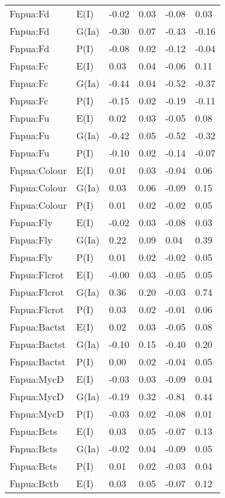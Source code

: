 \begin{center}
\begin{longtable}{|p{1.1in}|p{0.7in}|p{0.7in}|p{0.6in}|p{0.6in}|p{0.6in}|}
  Fnpua:Fd & E(I) & -0.02 & 0.03 & -0.08 & 0.03 \\ 
  Fnpua:Fd & G(Ia) & -0.30 & 0.07 & -0.43 & -0.16 \\ 
  Fnpua:Fd & P(I) & -0.08 & 0.02 & -0.12 & -0.04 \\ 
  Fnpua:Fc & E(I) & 0.03 & 0.04 & -0.06 & 0.11 \\ 
  Fnpua:Fc & G(Ia) & -0.44 & 0.04 & -0.52 & -0.37 \\ 
  Fnpua:Fc & P(I) & -0.15 & 0.02 & -0.19 & -0.11 \\ 
  Fnpua:Fu & E(I) & 0.02 & 0.03 & -0.05 & 0.08 \\ 
  Fnpua:Fu & G(Ia) & -0.42 & 0.05 & -0.52 & -0.32 \\ 
  Fnpua:Fu & P(I) & -0.10 & 0.02 & -0.14 & -0.07 \\ 
  Fnpua:Colour & E(I) & 0.01 & 0.03 & -0.04 & 0.06 \\ 
  Fnpua:Colour & G(Ia) & 0.03 & 0.06 & -0.09 & 0.15 \\ 
  Fnpua:Colour & P(I) & 0.01 & 0.02 & -0.02 & 0.05 \\ 
  Fnpua:Fly & E(I) & -0.02 & 0.03 & -0.08 & 0.03 \\ 
  Fnpua:Fly & G(Ia) & 0.22 & 0.09 & 0.04 & 0.39 \\ 
  Fnpua:Fly & P(I) & 0.01 & 0.02 & -0.02 & 0.05 \\ 
  Fnpua:Flcrot & E(I) & -0.00 & 0.03 & -0.05 & 0.05 \\ 
  Fnpua:Flcrot & G(Ia) & 0.36 & 0.20 & -0.03 & 0.74 \\ 
  Fnpua:Flcrot & P(I) & 0.03 & 0.02 & -0.01 & 0.06 \\ 
  Fnpua:Bactst & E(I) & 0.02 & 0.03 & -0.05 & 0.08 \\ 
  Fnpua:Bactst & G(Ia) & -0.10 & 0.15 & -0.40 & 0.20 \\ 
  Fnpua:Bactst & P(I) & 0.00 & 0.02 & -0.04 & 0.05 \\ 
  Fnpua:MycD & E(I) & -0.03 & 0.03 & -0.09 & 0.04 \\ 
  Fnpua:MycD & G(Ia) & -0.19 & 0.32 & -0.81 & 0.44 \\ 
  Fnpua:MycD & P(I) & -0.03 & 0.02 & -0.08 & 0.01 \\ 
  Fnpua:Bcts & E(I) & 0.03 & 0.05 & -0.07 & 0.13 \\ 
  Fnpua:Bcts & G(Ia) & -0.02 & 0.04 & -0.09 & 0.05 \\ 
  Fnpua:Bcts & P(I) & 0.01 & 0.02 & -0.03 & 0.04 \\ 
  Fnpua:Bctb & E(I) & 0.03 & 0.05 & -0.07 & 0.12 \\ 

\end{longtable}
\end{center}
